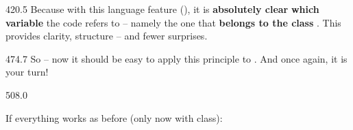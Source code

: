 \documentclass{aslab}
\begin{document}
\begin{region}[x=74.7,right=0,pitch=13.8]{420.5}
Because with this language feature (), it is \textbf{absolutely
clear} \textbf{which variable} the code refers to -- namely the one that
\textbf{belongs to the class} . This provides clarity,
structure -- and fewer surprises.
\end{region}

\begin{region}[x=74.7,right=0,pitch=17.6]{474.7}
So -- now it should be easy to apply this principle to .
And once again, it is your turn! 
\end{region}

\begin{region}[pitch=13.5]{508.0}
\begin{ptasks}[start=3]
\item If everything works as before (only now with class):\\
  \\
\end{ptasks}
\end{region}
\end{document}
